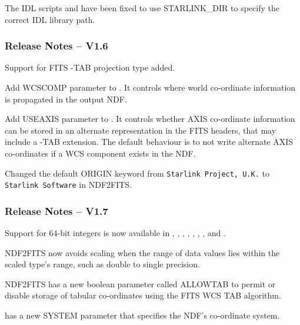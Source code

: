 \documentclass[twoside,11pt]{starlink}
\begin{document}
The IDL scripts  and
 have been fixed to use STARLINK\_DIR
to specify the correct IDL library path.

\subsubsection{Release Notes -- V1.6}

Support for FITS -TAB projection type added.

Add WCSCOMP parameter to .  It controls
where world co-ordinate information is propagated in the output NDF.

Add USEAXIS parameter to .  It controls
whether AXIS co-ordinate information can be stored in an alternate
representation in the FITS headers, that may include a -TAB
extension.  The default behaviour is to not write alternate AXIS
co-ordinates if a WCS component exists in the NDF.

Changed the default ORIGIN keyword from \texttt{Starlink Project,
U.K.} to \texttt{Starlink Software} in NDF2FITS.

\subsubsection{Release Notes -- V1.7}

Support for 64-bit integers is now available in
, ,
, ,
, ,
, and .

NDF2FITS now avoids scaling when the range of data values lies within
the scaled type's range, such as double to single precision.

NDF2FITS has a new boolean parameter called ALLOWTAB to permit or
disable storage of tabular co-ordinates using the FITS WCS TAB
algorithm.

 has a new SYSTEM parameter that
specifies the NDF's co-ordinate system.
\end{document}
